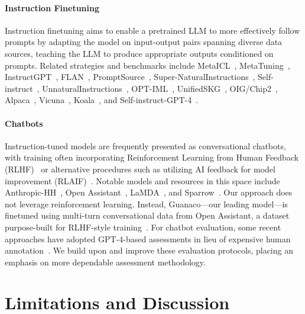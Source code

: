 \paragraph{Instruction Finetuning} Instruction finetuning aims to enable a pretrained LLM to more effectively follow prompts by adapting the model on input-output pairs spanning diverse data sources, teaching the LLM to produce appropriate outputs conditioned on prompts. Related strategies and benchmarks include MetaICL~\citep{min2021metaicl}, MetaTuning~\citep{zhong2021adapting}, InstructGPT~\citep{ouyang2022training}, FLAN~\citep{wei2021finetuned,chung2022scaling}, PromptSource~\citep{bach2022promptsource}, Super-NaturalInstructions~\citep{wang2022super,sanh2021multitask}, Self-instruct~\citep{wang2022self}, UnnaturalInstructions~\citep{honovich2022unnatural}, OPT-IML~\citep{iyer2022opt}, UnifiedSKG~\citep{xie2022unifiedskg}, OIG/Chip2~\citep{laion2023}, Alpaca~\citep{alpaca}, Vicuna~\citep{vicuna2023}, Koala~\citep{koala_blogpost_2023}, and Self-instruct-GPT-4~\citep{peng2023instruction}.

\paragraph{Chatbots} Instruction-tuned models are frequently presented as conversational chatbots, with training often incorporating Reinforcement Learning from Human Feedback (RLHF)~\citep{christiano2017deep} or alternative procedures such as utilizing AI feedback for model improvement (RLAIF)~\citep{bai2022constitutional}. Notable models and resources in this space include Anthropic-HH~\citep{askell2021general,bai2022training}, Open Assistant~\citep{kopf2023openassistant}, LaMDA~\citep{thoppilan2022lamda}, and Sparrow~\citep{glaese2022improving}. Our approach does not leverage reinforcement learning. Instead, Guanaco—our leading model—is finetuned using multi-turn conversational data from Open Assistant, a dataset purpose-built for RLHF-style training~\citep{kopf2023openassistant}. For chatbot evaluation, some recent approaches have adopted GPT-4-based assessments in lieu of expensive human annotation~\citep{vicuna2023,peng2023instruction}. We build upon and improve these evaluation protocols, placing an emphasis on more dependable assessment methodology.

\section{Limitations and Discussion}

